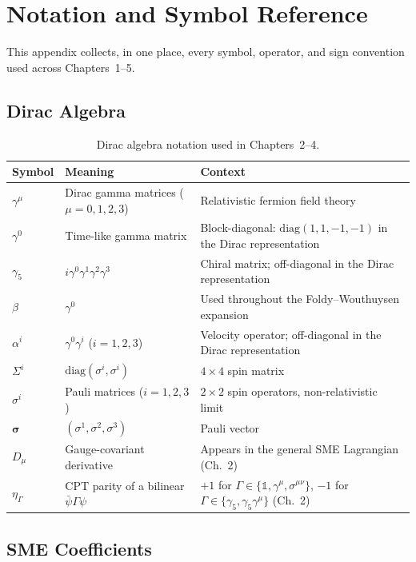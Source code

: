 \chapter{Notation and Symbol Reference}
\label{app:notation}

This appendix collects, in one place, every symbol, operator, and sign
convention used across Chapters~1--5.

\section{Dirac Algebra}

\begin{table}[h]
\centering
\begin{tabular}{@{}ll>{\raggedright\arraybackslash}p{6cm}@{}}
\toprule
Symbol & Meaning & Context \\
\midrule
$\gamma^\mu$ & Dirac gamma matrices ($\mu=0,1,2,3$) & Relativistic fermion field theory \\
$\gamma^0$ & Time-like gamma matrix & Block-diagonal: $\mathrm{diag}(1,1,-1,-1)$ in the Dirac representation \\
$\gamma_5$ & $i\gamma^0\gamma^1\gamma^2\gamma^3$ & Chiral matrix; off-diagonal in the Dirac representation \\
$\beta$ & $\gamma^0$ & Used throughout the Foldy--Wouthuysen expansion \\
$\alpha^i$ & $\gamma^0\gamma^i$ ($i=1,2,3$) & Velocity operator; off-diagonal in the Dirac representation \\
$\Sigma^i$ & $\mathrm{diag}(\sigma^i,\sigma^i)$ & $4\times4$ spin matrix \\
$\sigma^i$ & Pauli matrices ($i=1,2,3$) & $2\times2$ spin operators, non-relativistic limit \\
$\boldsymbol\sigma$ & $(\sigma^1,\sigma^2,\sigma^3)$ & Pauli vector \\
$D_\mu$ & Gauge-covariant derivative & Appears in the general SME Lagrangian (Ch.~2) \\
$\eta_\Gamma$ & CPT parity of a bilinear $\bar\psi\Gamma\psi$ & $+1$ for $\Gamma\in\{\mathbb 1,\gamma^\mu,\sigma^{\mu\nu}\}$, $-1$ for $\Gamma\in\{\gamma_5,\gamma_5\gamma^\mu\}$ (Ch.~2) \\
\bottomrule
\end{tabular}
\caption{Dirac algebra notation used in Chapters~2--4.}
\label{tab:app-dirac}
\end{table}

\section{SME Coefficients}

